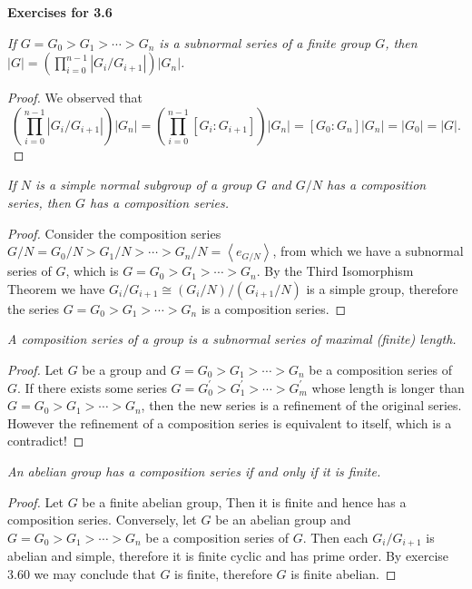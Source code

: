 \begin{center}
\begin{large}
    \textbf{Exercises for 3.6}
\end{large}
\end{center}
\begin{problem}\em
If $G=G_0>G_1>\cdots>G_n$ is a subnormal series of a finite group $G$, then $|G|=\left(\prod_{i=0}^{n-1}|G_i/G_{i+1}|\right)|G_n|$.
\end{problem}
\begin{proof}
We observed that 
$$
\left( \prod_{i=0}^{n-1}{\left| G_i/G_{i+1} \right|} \right) \left| G_n \right|=\left( \prod_{i=0}^{n-1}{\left[ G_i:G_{i+1} \right]} \right) \left| G_n \right|=\left[ G_0:G_n \right] \left| G_n \right|=\left| G_0 \right|=\left| G \right|.
$$
\end{proof}
\begin{problem}\em
If $N$ is a simple normal subgroup of a group $G$ and $G/N$ has a composition series, then $G$ has a composition series.
\end{problem}
\begin{proof}
Consider the composition series $G/N=G_0/N>G_1/N>\cdots >G_n/N=\left< e_{G/N} \right> $, from which we have a subnormal series of $G$, which is $G=G_0>G_1>\cdots >G_n$. By the Third Isomorphism Theorem we have $G_i/G_{i+1}\cong \left( G_i/N \right) /\left( G_{i+1}/N \right) $ is a simple group, therefore the series $G=G_0>G_1>\cdots >G_n$ is a composition series.
\end{proof}
\begin{problem}\em
A composition series of a group is a subnormal series of maximal (finite) length.
\end{problem}
\begin{proof}
Let $G$ be a group and $G=G_0>G_1>\cdots >G_n$ be a composition series of $G$. If there exists some series $G=G_0^\prime>G_1^\prime>\cdots >G_m^\prime$ whose length is longer than $G=G_0>G_1>\cdots >G_n$, then the new series is a refinement of the original series. However the refinement of a composition series is equivalent to itself, which is a contradict!
\end{proof}
\begin{problem}\em
An abelian group has a composition series if and only if it is finite.
\end{problem}
\begin{proof}
Let $G$ be a finite abelian group, Then it is finite and hence has a composition series. Conversely, let $G$ be an abelian group and $G=G_0>G_1>\cdots>G_n$ be a composition series of $G$. Then each $G_i/G_{i+1}$ is abelian and simple, therefore it is finite cyclic and has prime order. By exercise 3.60 we may conclude that $G$ is finite, therefore $G$ is finite abelian.
\end{proof}
